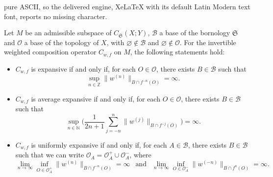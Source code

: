 \documentclass[10pt,a4paper]{amsart}
\newcommand{\N}{\mathbb{N}} %
\newcommand{\Z}{\mathbb{Z}} %
\newcommand{\cB}{\mathcal{B}}
\newcommand{\cO}{\mathcal{O}}
\newcommand{\fS}{\mathfrak{S}}
\begin{document}
pure ASCII, so the delivered engine, XeLaTeX with its default Latin Modern text font, reports no missing character.
\begin{theorem}\label{ExpCX-T1}
Let $M$ be an admissible subspace of $C_\fS(X;Y)$, $\cB$ a base of the bornology $\fS$ and $\cO$ a base of the topology of $X$,
with $\varnothing \not\in \cB$ and $\varnothing \not\in \cO$. 
For the invertible weighted composition operator $C_{w,f}$ on $M$, the following statements hold:
\begin{itemize}
\item [\rm (a)] $C_{w,f}$ is expansive if and only if, for each $O \in \cO$, there exists $B \in \cB$ such that
    \[
    \sup_{n \in \Z} \|w^{(n)}\|_{B \cap f^{-n}(O)} = \infty.
    \]
\item [\rm (b)] $C_{w,f}$ is average expansive if and only if, for each $O \in \cO$, there exists $B \in \cB$ such that
    \[
    \sup_{n \in \N} \Big(\frac{1}{2n+1} \sum_{j=-n}^n \|w^{(j)}\|_{B \cap f^{-j}(O)}\Big) = \infty.
    \]
\item [\rm (c)] $C_{w,f}$ is uniformly expansive if and only if, for each $A \in \cB$,
    there exists $B \in \cB$ such that we can write $\cO_A = \cO_A^+ \cup \cO_A^-$, where
    \[
    \lim_{n \to \infty} \inf_{O \in \cO_A^+} \|w^{(n)}\|_{B\cap f^{-n}(O)} = \infty \ \ \text{ and } \ \ 
    \lim_{n \to \infty} \inf_{O \in \cO_A^-} \|w^{(-n)}\|_{B\cap f^{n}(O)} = \infty.
    \]
\end{itemize}
\end{theorem}
\end{document}
